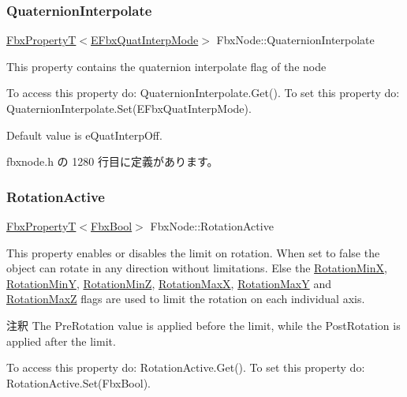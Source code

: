 \subsubsection{\texorpdfstring{Quaternion\+Interpolate}{QuaternionInterpolate}}
{\footnotesize\ttfamily \hyperlink{class_fbx_property_t}{Fbx\+PropertyT}$<$\hyperlink{fbxmath_8h_a9c7a0dfb52c83256d4a92c5c6d1be72a}{E\+Fbx\+Quat\+Interp\+Mode}$>$ Fbx\+Node\+::\+Quaternion\+Interpolate}

This property contains the quaternion interpolate flag of the node

To access this property do\+: Quaternion\+Interpolate.\+Get(). To set this property do\+: Quaternion\+Interpolate.\+Set(\+E\+Fbx\+Quat\+Interp\+Mode).

Default value is e\+Quat\+Interp\+Off. 

 fbxnode.\+h の 1280 行目に定義があります。

\mbox{\label{class_fbx_node_aaa4a7a57dc28f7979c04c096bd94b752}} 
\subsubsection{\texorpdfstring{Rotation\+Active}{RotationActive}}
{\footnotesize\ttfamily \hyperlink{class_fbx_property_t}{Fbx\+PropertyT}$<$\hyperlink{fbxtypes_8h_a92e0562b2fe33e76a242f498b362262e}{Fbx\+Bool}$>$ Fbx\+Node\+::\+Rotation\+Active}

This property enables or disables the limit on rotation. When set to {\ttfamily false} the object can rotate in any direction without limitations. Else the \hyperlink{class_fbx_node_a8b07f4e0bae14c76b79405c0f881a492}{Rotation\+MinX}, \hyperlink{class_fbx_node_aa1e032cbdaad4bac9ef9dbc6efe3fcea}{Rotation\+MinY}, \hyperlink{class_fbx_node_ab78b8c903c7104974ff2567dbc43f3cf}{Rotation\+MinZ}, \hyperlink{class_fbx_node_a727d3f12af78c3ae37e77b5d87c97f79}{Rotation\+MaxX}, \hyperlink{class_fbx_node_a4182202837129c1e05f5dba5b37cb8c6}{Rotation\+MaxY} and \hyperlink{class_fbx_node_a6d1242899fb510f5d5df4f3a1a7cf32c}{Rotation\+MaxZ} flags are used to limit the rotation on each individual axis. \begin{DoxyRemark}{注釈}
The Pre\+Rotation value is applied before the limit, while the Post\+Rotation is applied after the limit.
\end{DoxyRemark}
To access this property do\+: Rotation\+Active.\+Get(). To set this property do\+: Rotation\+Active.\+Set(\+Fbx\+Bool).

